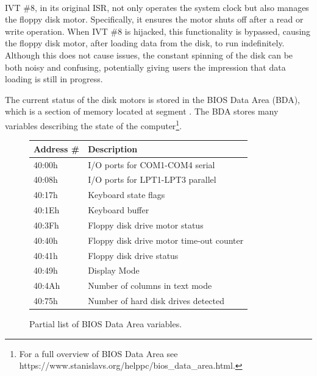 \documentclass[book.tex]{subfiles}
\begin{document}
\par
\begin{minipage}{\textwidth}

\end{minipage}\\

\par
IVT \#8, in its original ISR, not only operates the system clock but also manages the floppy disk motor. Specifically, it ensures the motor shuts off after a read or write operation. When IVT \#8 is hijacked, this functionality is bypassed, causing the floppy disk motor, after loading data from the disk, to run indefinitely. Although this does not cause issues, the constant spinning of the disk can be both noisy and confusing, potentially giving users the impression that data loading is still in progress.\\

\par
The current status of the disk motors is stored in the BIOS Data Area (BDA), which is a section of memory located at segment . The BDA stores many variables describing the state of the computer\footnote{For a full overview of BIOS Data Area see https://www.stanislavs.org/helppc/bios\_data\_area.html.}.\\

\begin{figure}[H]
	\renewcommand{\arraystretch}{1.2}
	\centering
	\begin{tabularx}{\textwidth}{ l p{}  }
	  \toprule
	  \textbf{Address \#} & \textbf{Description} \\ \bottomrule
40:00h	&	I/O ports for COM1-COM4 serial \\
40:08h	&	I/O ports for LPT1-LPT3 parallel \\
40:17h	&	Keyboard state flags \\
40:1Eh	&	Keyboard buffer \\
40:3Fh	&	Floppy disk drive motor status \\
40:40h	&	Floppy disk drive motor time-out counter \\
40:41h	&	Floppy disk drive status \\
40:49h & 	Display Mode \\
40:4Ah & 	Number of columns in text mode \\
40:75h & 	Number of hard disk drives detected \\
		\bottomrule
	\end{tabularx}
	\caption{Partial list of BIOS Data Area variables.}
\end{figure}
\end{document}
